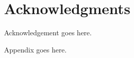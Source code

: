 \documentclass{sig-alternate-ipsn13}
\begin{document}
\section*{Acknowledgments}
Acknowledgement goes here.

%

%
%
\appendix

Appendix goes here.

\end{document}
